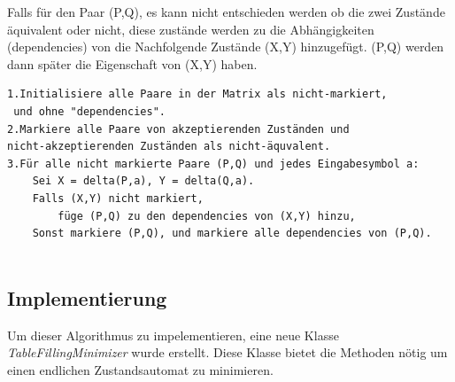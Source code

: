 Falls für den Paar (P,Q), es kann nicht entschieden werden ob die zwei Zustände
äquivalent oder nicht, diese zustände werden zu die Abhängigkeiten
(dependencies) von die Nachfolgende Zustände (X,Y) hinzugefügt. (P,Q) werden
dann später die Eigenschaft von (X,Y) haben.

\lstset{language=C, basicstyle=\footnotesize}
\begin{lstlisting}[float=h!, frame=tb, captionpos=b,
caption={Table-Filling-Algorithmus : Pseudocode}, label=list:TextGrammar]
1.Initialisiere alle Paare in der Matrix als nicht-markiert,
 und ohne "dependencies".
2.Markiere alle Paare von akzeptierenden Zuständen und 
nicht-akzeptierenden Zuständen als nicht-äquvalent.
3.Für alle nicht markierte Paare (P,Q) und jedes Eingabesymbol a:
	Sei X = delta(P,a), Y = delta(Q,a).
	Falls (X,Y) nicht markiert, 
		füge (P,Q) zu den dependencies von (X,Y) hinzu,
	Sonst markiere (P,Q), und markiere alle dependencies von (P,Q).
	
\end{lstlisting}

\subsection{Implementierung}

Um dieser Algorithmus zu impelementieren, eine neue Klasse
\textit{TableFillingMinimizer} wurde erstellt. Diese Klasse bietet die Methoden
nötig um einen endlichen Zustandsautomat zu minimieren.

